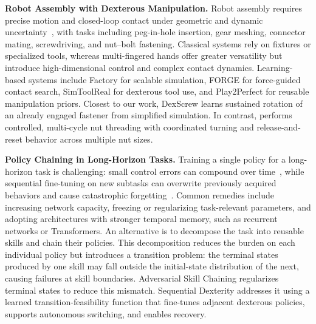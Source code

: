 
\textbf{Robot Assembly with Dexterous Manipulation.}
Robot assembly requires precise motion and closed-loop contact under geometric
and dynamic uncertainty~\cite{siciliano2016springer}, with tasks including
peg-in-hole insertion, gear meshing, connector mating, screwdriving, and
nut--bolt fastening. Classical systems rely on fixtures or specialized tools,
whereas multi-fingered hands offer greater versatility but introduce
high-dimensional control and complex contact dynamics. Learning-based systems
include Factory\cite{narang2022factory} for scalable simulation,
FORGE\cite{noseworthy2025forge} for force-guided contact search,
SimToolReal\cite{simtoolreal} for dexterous tool use, and
Play2Perfect\cite{play2perfect} for reusable manipulation priors. Closest to
our work, DexScrew\cite{dexscrew} learns sustained rotation of an already
engaged fastener from simplified simulation. In contrast,
\methodname{} performs controlled, multi-cycle nut threading with coordinated
turning and release-and-reset behavior across multiple nut sizes.

\textbf{Policy Chaining in Long-Horizon Tasks.}
Training a single policy for a long-horizon task is challenging: small control
errors can compound over time~\cite{ross2011reduction}, while sequential
fine-tuning on new subtasks can overwrite previously acquired behaviors and
cause catastrophic forgetting~\cite{kirkpatrick2017overcoming}. Common remedies
include increasing network capacity, freezing or regularizing task-relevant
parameters, and adopting architectures with stronger temporal memory, such as
recurrent networks or Transformers. An alternative is to decompose the task
into reusable skills and chain their policies. This decomposition reduces the
burden on each individual policy but introduces a transition problem: the
terminal states produced by one skill may fall outside the initial-state
distribution of the next, causing failures at skill boundaries. Adversarial
Skill Chaining\cite{lee2022adversarial} regularizes terminal states to reduce
this mismatch. Sequential Dexterity\cite{chen2023sequential} addresses it using
a learned transition-feasibility function that fine-tunes adjacent dexterous
policies, supports autonomous switching, and enables recovery.

